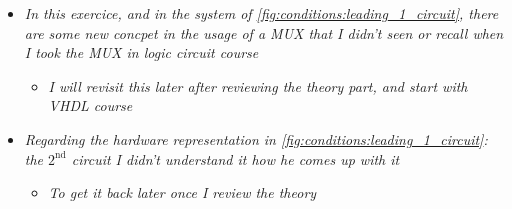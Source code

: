  

\begin{itemize}

\item \textit{In this exercice, and in the system of \autoref{fig:conditions:leading_1_circuit}, there are some new concpet in the usage of a MUX that I didn't seen or recall when I took the MUX in logic circuit course}

	\begin{itemize}
	\item \textit{I will revisit this later after reviewing the theory part, and start with VHDL course}
	\end{itemize}


\item \textit{Regarding the hardware representation in \autoref{fig:conditions:leading_1_circuit}: the $\mathrm{2}^\mathrm{nd}$ circuit I didn't understand it how he comes up with it}

	\begin{itemize}
	\item \textit{To get it back later once I review the theory}
	\end{itemize}

\end{itemize}





